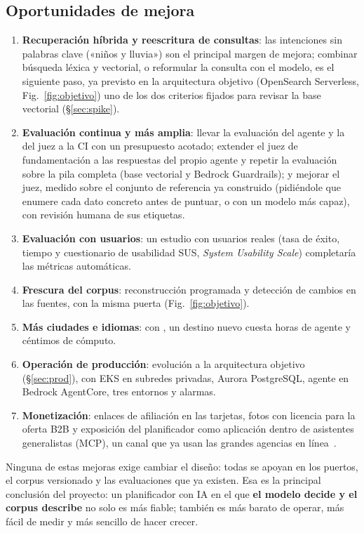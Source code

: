 \subsection{Oportunidades de mejora}

\begin{enumerate}[label=\textbf{M\arabic*}]
  \item \textbf{Recuperación híbrida y reescritura de consultas}: las intenciones sin palabras
        clave («niños y lluvia») son el principal margen de mejora; combinar búsqueda léxica y
        vectorial, o reformular la consulta con el modelo, es el siguiente paso, ya previsto en la
        arquitectura objetivo (OpenSearch Serverless, Fig.~\ref{fig:objetivo}) uno de los dos criterios fijados para revisar la base vectorial (§\ref{sec:spike}).
  \item \textbf{Evaluación continua y más amplia}: llevar la evaluación del agente y la del juez a
        la CI con un presupuesto acotado; extender el juez de fundamentación a las respuestas del
        propio agente y repetir la evaluación sobre la pila completa (base vectorial y
        Bedrock Guardrails); y mejorar el juez, medido sobre el conjunto de referencia ya construido (pidiéndole que
        enumere cada dato concreto antes de puntuar, o con un modelo más capaz), con revisión humana
        de sus etiquetas.
  \item \textbf{Evaluación con usuarios}: un estudio con usuarios reales (tasa de éxito, tiempo y
        cuestionario de usabilidad SUS, \emph{System Usability Scale}) completaría las métricas automáticas.
  \item \textbf{Frescura del corpus}: reconstrucción programada y detección de cambios en las
        fuentes, con la misma puerta (Fig.~\ref{fig:objetivo}).
  \item \textbf{Más ciudades e idiomas}: con , un destino nuevo cuesta horas de
        agente y céntimos de cómputo.
  \item \textbf{Operación de producción}: evolución a la arquitectura objetivo (§\ref{sec:prod}),
        con EKS en subredes privadas, Aurora PostgreSQL, agente en Bedrock AgentCore, tres
        entornos y alarmas.
  \item \textbf{Monetización}: enlaces de afiliación en las tarjetas, fotos con licencia para la
        oferta B2B y exposición del planificador como aplicación dentro de asistentes generalistas
        (MCP), un canal que ya usan las grandes agencias en línea~\cite{lee2025chatgptapps}.
\end{enumerate}

Ninguna de estas mejoras exige cambiar el diseño: todas se apoyan en los puertos, el corpus
versionado y las evaluaciones que ya existen. Esa es la principal conclusión del proyecto: un
planificador con IA en el que \textbf{el modelo decide y el corpus describe} no solo es más
fiable; también es más barato de operar, más fácil de medir y más sencillo de hacer crecer.
